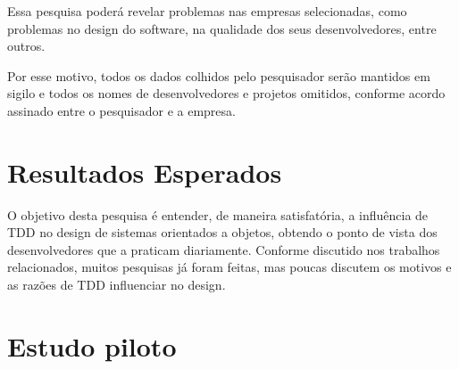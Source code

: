 Essa pesquisa poderá revelar problemas nas empresas selecionadas, como problemas
no design do software, na qualidade dos seus desenvolvedores, entre outros. 

Por esse motivo, todos os dados colhidos pelo pesquisador serão mantidos em
sigilo e todos os nomes de desenvolvedores e projetos omitidos, conforme acordo 
assinado entre o pesquisador e a empresa.

\section{Resultados Esperados}
\label{sec:planejamento-resultados-esperados}

O objetivo desta pesquisa é entender, de maneira satisfatória, a influência de 
TDD no design de sistemas orientados a objetos, obtendo o ponto de vista dos 
desenvolvedores que a praticam diariamente. Conforme discutido nos trabalhos 
relacionados, muitos pesquisas já foram feitas, mas poucas discutem os motivos 
e as razões de TDD influenciar no design.

\section{Estudo piloto}


